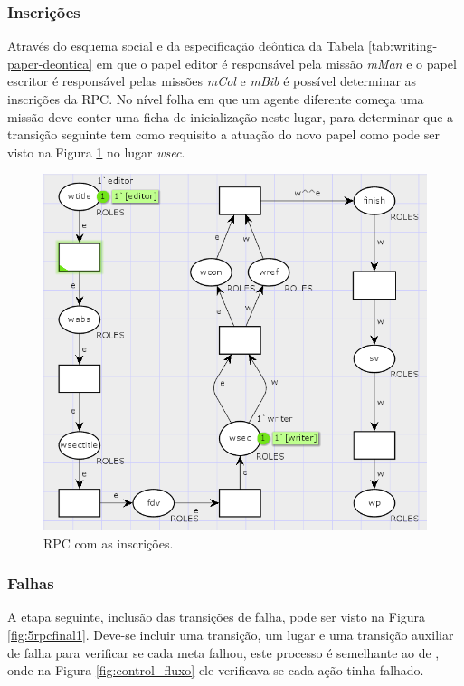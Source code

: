 \subsubsection{Inscrições}

Através do esquema social e da especificação deôntica da Tabela \ref{tab:writing-paper-deontica} em que o papel editor é responsável pela missão \textit{mMan} e o papel escritor é responsável pelas missões \textit{mCol} e \textit{mBib} é possível determinar as inscrições da RPC. No nível folha em que um agente diferente começa uma missão deve conter uma ficha de inicialização neste lugar, para determinar que a transição seguinte tem como requisito a atuação do novo papel como pode ser visto na Figura \ref{fig:5inscricao1} no lugar \textit{wsec}.

\begin{figure}[ht]
\centering
\includegraphics[scale=0.7]{imagens/5-inscricao1.png}
\caption{RPC com as inscrições.}
\label{fig:5inscricao1}
\end{figure}

\subsubsection{Falhas}

A etapa seguinte, inclusão das transições de falha, pode ser visto na Figura \ref{fig:5rpcfinal1}. Deve-se incluir uma transição, um lugar e uma transição auxiliar de falha para verificar se cada meta falhou, este processo é semelhante ao de \cite{winikoff2017bdi}, onde na Figura \ref{fig:control_fluxo} ele verificava se cada ação tinha falhado.

